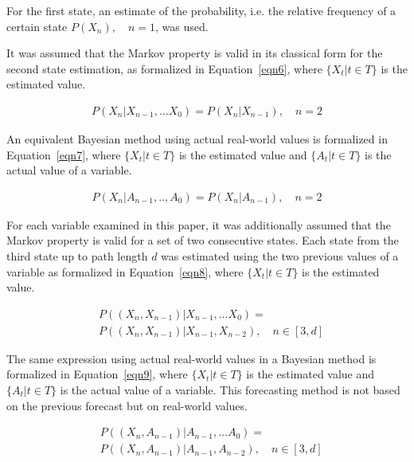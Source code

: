 \documentclass[preprint,12pt]{elsarticle}
\begin{document}
For the first state, an estimate of the probability, i.e. the relative frequency of a certain state $P(X_{n}), \quad n = 1$, was used.

It was assumed that the Markov property is valid in its classical form for the second state estimation, as formalized in Equation~\ref{eqn6}, where $\{X_{t}|t\in T\}$ is the estimated value.

\begin{equation} \label{eqn6}
    \begin{aligned}
        P(X_{n}|X_{n-1}, \dots X_{0}) = P(X_{n}|X_{n-1}), \quad n = 2
    \end{aligned}
\end{equation}

An equivalent Bayesian method using actual real-world values is formalized in Equation~\ref{eqn7}, where $\{X_{t}|t\in T\}$ is the estimated value and $\{A_{t}|t\in T\}$ is the actual value of a variable.

\begin{equation} \label{eqn7}
    \begin{aligned}
        P(X_{n}|A_{n-1},..,A_{0}) = P(X_{n}|A_{n-1}), \quad n = 2
    \end{aligned}
\end{equation}

For each variable examined in this paper, it was additionally assumed that the Markov property is valid for a set of two consecutive states. Each state from the third state up to path length $d$ was estimated using the two previous values of a variable as formalized in Equation~\ref{eqn8}, where $\{X_{t}|t\in T\}$ is the estimated value.

\begin{equation} \label{eqn8}
    \begin{aligned}
        & P((X_{n},X_{n-1})|X_{n-1}, \dots X_{0}) = \\
        & P((X_{n},X_{n-1})|X_{n- 1},X_{n-2}), \quad n \in \left[3, d\right]
    \end{aligned}
\end{equation}

The same expression using actual real-world values in a Bayesian method is formalized in Equation~\ref{eqn9}, where $\{X_{t}|t\in T\}$ is the estimated value and $\{A_{t}|t\in T\}$ is the actual value of a variable. This forecasting method is not based on the previous forecast but on real-world values.

\begin{equation} \label{eqn9}
    \begin{aligned}
        & P((X_{n},A_{n-1})|A_{n-1}, \dots A_{0}) = \\
        & P((X_{n},A_{n-1})|A_{n- 1},A_{n-2}), \quad n \in \left[3, d\right]
    \end{aligned}
\end{equation}
\end{document}
